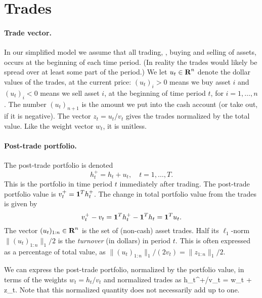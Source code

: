 \documentclass[openany]{now}
\begin{document}
\section{Trades}
\paragraph{Trade vector.}
In our simplified model we assume that all trading, \ie,
buying and selling of assets, occurs at the beginning of each time period.
(In reality the trades would likely be spread over at least some part of the period.)
We let $u_t \in {\mbox{\bf R}}^n$ denote the dollar values of the
trades, at the current price: $(u_t)_i>0$ means we buy
asset $i$ and $(u_t)_i<0$ means we sell
asset $i$, at the beginning of time period $t$, for $i=1, \ldots, n$.
The number $(u_t)_{n+1}$ is the amount we put into the cash account (or take out,
if it is negative).
The vector $z_t = u_t/v_t$ gives the trades normalized by the total value.
Like the weight vector $w_t$, it is unitless.

\paragraph{Post-trade portfolio.}
The post-trade portfolio is denoted
\[
h_t^+ = h_t + u_t, \quad t=1,\ldots, T.
\]
This is the portfolio in time period $t$ immediately after trading.
The post-trade portfolio value is $v_t^+ = \mathbf 1^T h_t^+$.
The change in total portfolio value from the trades is given by
\[
v_t ^+ - v_t = \mathbf 1^T h_t^+ - \mathbf 1^T h_t = \mathbf 1^T u_t.
\]
The vector $(u_t)_{1:n}\in {\mbox{\bf R}}^n$ is the set of (non-cash) asset trades.
Half its $\ell_1$-norm $\|(u_t)_{1:n}\|_1/2$ is the \emph{turnover}
(in dollars) in period $t$.
This is often expressed as a percentage of total value, as
$\|(u_t)_{1:n}\|_1/(2v_t) = \|z_{1:n}\|_1/2$.

We can express the post-trade portfolio, normalized by the portfolio
value, in terms of the weights $w_t=h_t/v_t$ and normalized trades as
\BEQ\label{e-wt+}
h_t^+/v_t = w_t + z_t.
\EEQ
Note that this normalized quantity does not necessarily add up to one.
\end{document}
